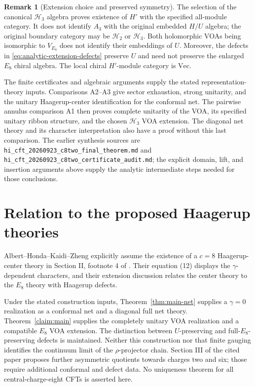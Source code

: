 \documentclass[11pt,a4paper]{article}
\theoremstyle{definition}
\newtheorem{remark}[theorem]{Remark}
\renewcommand{\Vec}{\mathrm{Vec}}
\newcommand{\HH}{\mathcal H}
\newcommand{\artifact}[1]{\textnormal{\nolinkurl{#1}}}
\begin{document}
\begin{remark}[Extension choice and preserved symmetry]
\label{rem:analytic-extension-scope}
The selection of the canonical $\HH_3$ algebra proves existence of
$H'$ with the specified all-module category.  It does not identify
$A_3$ with the original embedded $H/U$ algebra; the original boundary
category may be $\HH_2$ or $\HH_3$.  Both holomorphic VOAs being
isomorphic to $V_{E_8}$ does not identify their embeddings of $U$.
Moreover, the defects in \eqref{eq:analytic-extension-defects} preserve
$U$ and need not preserve the enlarged $E_8$ chiral algebra.
The local chiral $H'$-module category is $\Vec$.
\end{remark}

The finite certificates and algebraic arguments supply the stated
representation-theory inputs.  Comparisons A2--A3 give sector
exhaustion, strong unitarity, and the unitary Haagerup-center
identification for the conformal net.  The pairwise annulus comparison
A1 then proves complete unitarity of the VOA, its specified unitary
ribbon structure, and the chosen $\HH_3$ VOA extension.  The diagonal
net theory and its character interpretation also have a proof without
this last comparison.  The earlier synthesis sources are
\artifact{hi_cft_20260923_c8two_final_theorem.md} and
\artifact{hi_cft_20260923_c8two_certificate_audit.md}; the explicit
domain, lift, and insertion arguments above supply the analytic
intermediate steps needed for those conclusions.


\section{Relation to the proposed Haagerup theories}\label{sec:comparison}
Albert--Honda--Kaidi--Zheng explicitly assume the existence of a
\(c=8\) Haagerup-center theory in Section II, footnote 4 of
\cite{AHKZ}.
Their equation (12) displays the \(\gamma\)-dependent characters,
and their extension discussion relates the center theory to the
\(E_8\) theory with Haagerup defects.

Under the stated construction inputs, Theorem~\ref{thm:main-net}
supplies a $\gamma=0$ realization as a conformal net and a diagonal
full net theory. Theorem~\ref{claim:main} supplies the completely unitary VOA
realization and a compatible $E_8$ VOA extension. The distinction
between $U$-preserving and full-$E_8$-preserving defects is maintained.
Neither this construction
nor that finite gauging identifies the continuum limit of the
\(\rho\)-projector chain. Section III of the cited paper proposes
further asymmetric quotients towards charges two and six; those require
additional conformal and defect data. No uniqueness theorem for all
central-charge-eight CFTs is asserted here.
\end{document}
